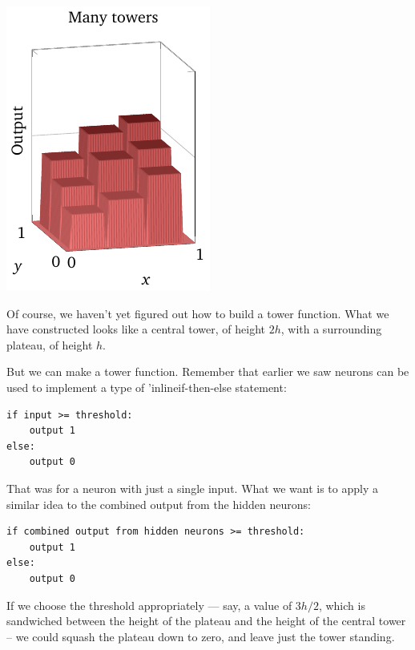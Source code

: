 \documentclass[a4paper,twoside,10pt]{book}
\begin{document}
\begin{center}
\includegraphics[width=0.32\linewidth]{./figures/ch4/3d/manytowers}
\end{center}
Of course, we haven't yet figured out how to build a tower function. What we have constructed looks like a central tower, of height $2h$, with a surrounding plateau, of height $h$.

But we can make a tower function. Remember that earlier we saw neurons can be used to implement a type of 'inline{if-then-else} statement:
\begin{lstlisting}
if input >= threshold: 
	output 1
else:
	output 0
\end{lstlisting}
That was for a neuron with just a single input. What we want is to apply a similar idea to the combined output from the hidden neurons:
\begin{lstlisting}
if combined output from hidden neurons >= threshold:
	output 1
else:
	output 0
\end{lstlisting}
If we choose the threshold appropriately --- say, a value of $3h/2$, which is sandwiched between the height of the plateau and the height of the central tower -- we could squash the plateau down to zero, and leave just the tower standing.
\end{document}
